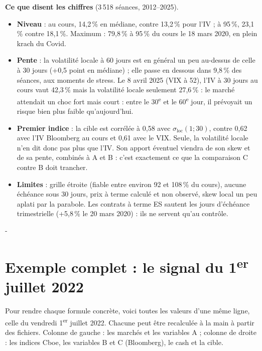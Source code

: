 \documentclass[10pt,a4paper]{article}
\makeatletter
\newcommand{\besoin}[1]{\par\penalty-100\begingroup\setlength{\dimen@}{#1}%
  \dimen@ii\pagegoal\advance\dimen@ii-\pagetotal
  \ifdim\dimen@>\dimen@ii\ifdim\dimen@ii>\z@\vfil\fi\break\fi\endgroup}
\let\sectionorigine\section
\renewcommand{\section}{\besoin{6\baselineskip}\sectionorigine}
\makeatother
\begin{document}
\textbf{Ce que disent les chiffres} (3\,518 séances, 2012–2025).
\begin{itemize}[nosep,leftmargin=*]
  \item \textbf{Niveau} : au cours, 14,2\,\% en médiane, contre 13,2\,\% pour l'IV ; à 95\,\%, 23,1\,\% contre 18,1\,\%. Maximum : 79,8\,\% à 95\,\% du cours le 18 mars 2020, en plein krach du Covid.
  \item \textbf{Pente} : la volatilité locale à 60 jours est en général un peu au-dessus de celle à 30 jours (+0,5 point en médiane) ; elle passe en dessous dans 9,8\,\% des séances, aux moments de stress. Le 8 avril 2025 (VIX à 52), l'IV à 30 jours au cours vaut 42,3\,\% mais la volatilité locale seulement 27,6\,\% : le marché attendait un choc fort mais court : entre le 30\textsuperscript{e} et le 60\textsuperscript{e} jour, il prévoyait un risque bien plus faible qu'aujourd'hui.
  \item \textbf{Premier indice} : la cible est corrélée à 0,58 avec $\sigma_{\mathrm{loc}}(1;30)$, contre 0,62 avec l'IV Bloomberg au cours et 0,61 avec le VIX. Seule, la volatilité locale n'en dit donc pas plus que l'IV. Son apport éventuel viendra de son skew et de sa pente, combinés à A et B : c'est exactement ce que la comparaison C contre B doit trancher.
  \item \textbf{Limites} : grille étroite (fiable entre environ 92 et 108\,\% du cours), aucune échéance sous 30 jours, prix à terme calculé et non observé, skew local un peu aplati par la parabole. Les contrats à terme ES sautent les jours d'échéance trimestrielle (+5,8\,\% le 20 mars 2020) : ils ne servent qu'au contrôle.
\end{itemize}

\section{Exemple complet : le signal du 1\textsuperscript{er} juillet 2022}\label{sec:exemple}
Pour rendre chaque formule concrète, voici toutes les valeurs d'une même ligne, celle du vendredi 1\textsuperscript{er} juillet 2022. Chacune peut être recalculée à la main à partir des fichiers. Colonne de gauche : les marchés et les variables A ; colonne de droite : les indices Cboe, les variables B et C (Bloomberg), le cash et la cible.
\end{document}
